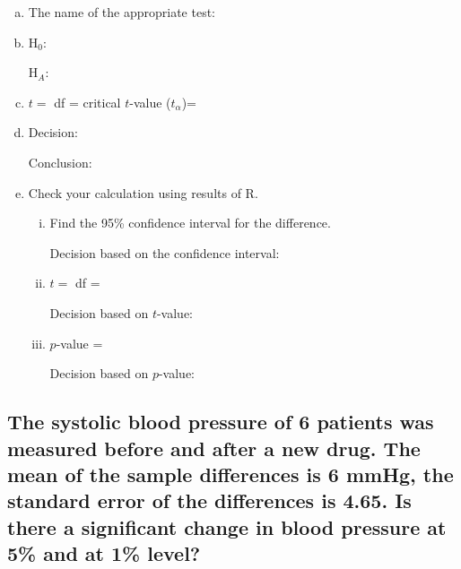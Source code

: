				
\begin{enumerate}[a)]
\item The name of the appropriate test: \hrulefill
\item H$_0$:	 \hrulefill


	 H$_A$:	 \hrulefill
\item $t =$ 	 \hrulefill\quad  df = \hrulefill \quad critical $t$-value ($t_\alpha$)= \hrulefill
\item Decision: 	 \hrulefill

	 Conclusion: \hrulefill


\item Check your calculation using results of R.





	\begin{enumerate}[i)]
	\item Find the 95\% confidence interval for the difference. 	 \hrulefill
	
	
		Decision based on the confidence interval: 		\hrulefill
	\item $t =$ 	 \hrulefill\quad df = 	\hrulefill	
	
		 Decision based on $t$-value: 	\hrulefill
	\item $p$-value = \hrulefill 
	
		Decision based on $p$-value: 	\hrulefill
	\end{enumerate}
\end{enumerate}



	
	
\subsection{The systolic blood pressure of 6 patients was measured before and after a new drug. The mean of the sample differences is 6 mmHg, the standard error of the differences is 4.65. Is there a significant change in blood pressure at 5\% and at 1\% level?}

